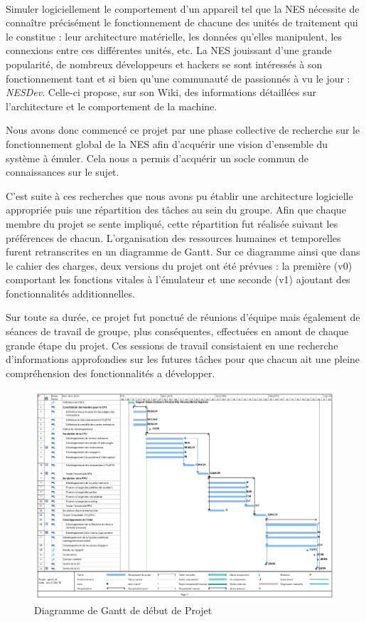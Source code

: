 \paragraph{}

Simuler logiciellement le comportement d'un appareil tel que la NES nécessite de connaître précisément le fonctionnement de chacune des unités de traitement qui le constitue : leur architecture matérielle, les données qu'elles manipulent, les connexions entre ces différentes unités, etc. La NES jouissant d'une grande popularité, de nombreux développeurs et hackers se sont intéressés à son fonctionnement tant et si bien qu'une communauté de passionnés à vu le jour : \emph{NESDev}. Celle-ci propose, sur son Wiki, des informations détaillées sur l'architecture et le comportement de la machine.

Nous avons donc commencé ce projet par une phase collective de recherche sur le fonctionnement global de la NES afin d'acquérir une vision d'ensemble du système à émuler. Cela nous a permis d'acquérir un socle commun de connaissances sur le sujet.

C'est suite à ces recherches que nous avons pu établir une architecture logicielle appropriée puis une répartition des tâches au sein du groupe. Afin que chaque membre du projet se sente impliqué, cette répartition fut réalisée suivant les préférences de chacun. L'organisation des ressources humaines et temporelles furent retranscrites en un diagramme de Gantt. Sur ce diagramme ainsi que dans le cahier des charges, deux versions du projet ont été prévues : la première (v0) comportant les fonctions vitales à l'émulateur et une seconde (v1) ajoutant des fonctionnalités additionnelles.

Sur toute sa durée, ce projet fut ponctué de réunions d'équipe mais également de séances de travail de groupe, plus conséquentes, effectuées en amont de chaque grande étape du projet. Ces sessions de travail consistaient en une recherche d'informations approfondies sur les futures tâches pour que chacun ait une pleine compréhension des fonctionnalités a développer.

\begin{figure}[h]
   \includegraphics[scale=0.45]{GanttV1.png}
   \caption{\label{étiquette} Diagramme de Gantt de début de Projet}
\end{figure}

